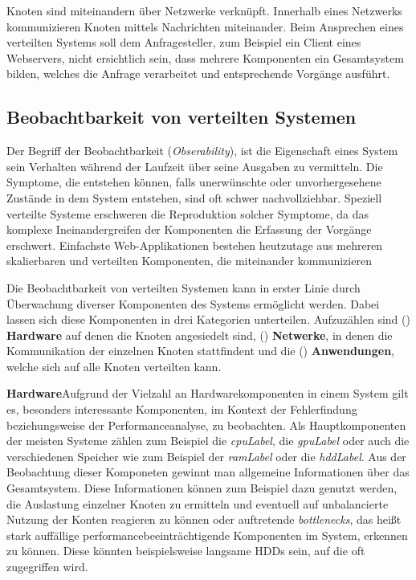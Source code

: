 	Knoten sind miteinandern über Netzwerke verknüpft. Innerhalb eines Netzwerks kommunizieren Knoten mittels Nachrichten miteinander. Beim Ansprechen eines verteilten Systems soll dem Anfragesteller, zum Beispiel ein Client eines Webservers, nicht ersichtlich sein, dass mehrere Komponenten ein Gesamtsystem bilden, welches die Anfrage verarbeitet und entsprechende Vorgänge ausführt. 
\subsection{Beobachtbarkeit von verteilten Systemen}
\label{subsection:Beobachtbarkeit von verteilten Systemen}
	Der Begriff der Beobachtbarkeit (\emph{Obserability}), ist die Eigenschaft eines System sein Verhalten während der Laufzeit über seine Ausgaben zu vermitteln. Die Symptome, die entstehen können, falls unerwünschte oder unvorhergesehene Zustände in dem System entstehen, sind oft schwer nachvollziehbar. Speziell verteilte Systeme erschweren die Reproduktion solcher Symptome, da das komplexe Ineinandergreifen der Komponenten die Erfassung der Vorgänge erschwert. Einfachste Web-Applikationen bestehen heutzutage aus mehreren skalierbaren und verteilten Komponenten, die miteinander kommunizieren

	Die Beobachtbarkeit von verteilten Systemen kann in erster Linie durch Überwachung diverser Komponenten des Systems ermöglicht werden. Dabei lassen sich diese Komponenten in drei Kategorien unterteilen. Aufzuzählen sind () \textbf{Hardware} auf denen die Knoten angesiedelt sind, () \textbf{Netwerke}, in denen die Kommunikation der einzelnen Knoten stattfindent und die () \textbf{Anwendungen}, welche sich auf alle Knoten verteilten kann.

	
	\textbf{Hardware}\space\space\space Aufgrund der Vielzahl an Hardwarekomponenten in einem System gilt es, besonders interessante Komponenten, im Kontext der Fehlerfindung beziehungsweise der Performanceanalyse, zu beobachten. Als Hauptkomponenten der meisten Systeme zählen zum Beispiel die \emph{\gls{cpuLabel}}, die \emph{\gls{gpuLabel}} oder auch die verschiedenen Speicher wie zum Beispiel der \emph{\gls{ramLabel}} oder die \emph{\gls{hddLabel}}. Aus der Beobachtung dieser Komponeten gewinnt man allgemeine Informationen über das Gesamtsystem. Diese Informationen können zum Beispiel dazu genutzt werden, die Auslastung einzelner Knoten zu ermitteln und eventuell auf unbalancierte Nutzung der Konten reagieren zu können oder auftretende \emph{bottlenecks}, das heißt stark auffällige performancebeeinträchtigende Komponenten im System, erkennen zu können. Diese könnten beispielsweise langsame HDDs sein, auf die oft zugegriffen wird.
	
